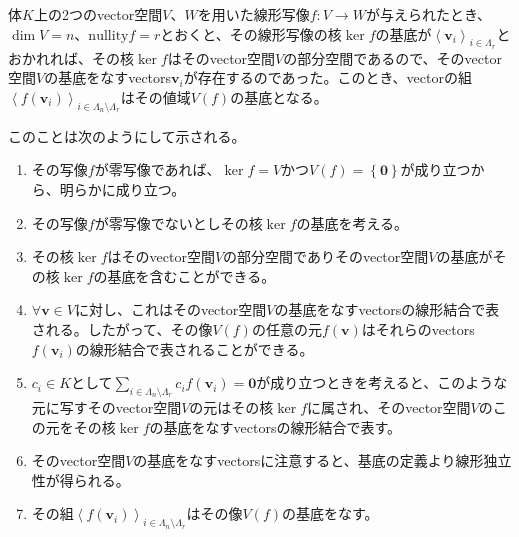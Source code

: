 \documentclass[dvipdfmx]{jsarticle}
\begin{document}
\begin{thm}\label{2.1.2.13}
体$K$上の2つのvector空間$V$、$W$を用いた線形写像$f:V \rightarrow W$が与えられたとき、$\dim V = n$、${\mathrm{nullity}}f = r$とおくと、その線形写像の核$\ker f$の基底が$\left\langle \mathbf{v}_{i} \right\rangle_{i \in \varLambda_{r}}$とおかれれば、その核$\ker f$はそのvector空間$V$の部分空間であるので、そのvector空間$V$の基底をなすvectors$\mathbf{v}_{i}$が存在するのであった。このとき、vectorの組$\left\langle f\left( \mathbf{v}_{i} \right) \right\rangle_{i \in \varLambda_{n} \setminus \varLambda_{r}}$はその値域$V(f)$の基底となる。
\end{thm}\par
このことは次のようにして示される。
\begin{enumerate}
\item
  その写像$f$が零写像であれば、$\ker f = V$かつ$V(f) = \left\{ \mathbf{0} \right\}$が成り立つから、明らかに成り立つ。
\item
  その写像$f$が零写像でないとしその核$\ker f$の基底を考える。
\item
  その核$\ker f$はそのvector空間$V$の部分空間でありそのvector空間$V$の基底がその核$\ker f$の基底を含むことができる。
\item
  $\forall\mathbf{v} \in V$に対し、これはそのvector空間$V$の基底をなすvectorsの線形結合で表される。したがって、その像$V(f)$の任意の元$f\left( \mathbf{v} \right)$はそれらのvectors$f\left( \mathbf{v}_{i} \right)$の線形結合で表されることができる。
\item
  $c_{i} \in K$として$\sum_{i \in \varLambda_{n} \setminus \varLambda_{r}} {c_{i}f\left( \mathbf{v}_{i} \right)} = \mathbf{0}$が成り立つときを考えると、このような元に写すそのvector空間$V$の元はその核$\ker f$に属され、そのvector空間$V$のこの元をその核$\ker f$の基底をなすvectorsの線形結合で表す。
\item
  そのvector空間$V$の基底をなすvectorsに注意すると、基底の定義より線形独立性が得られる。
\item
  その組$\left\langle f\left( \mathbf{v}_{i} \right) \right\rangle_{i \in \varLambda_{n} \setminus \varLambda_{r}}$はその像$V(f)$の基底をなす。
\end{enumerate}
\end{document}
